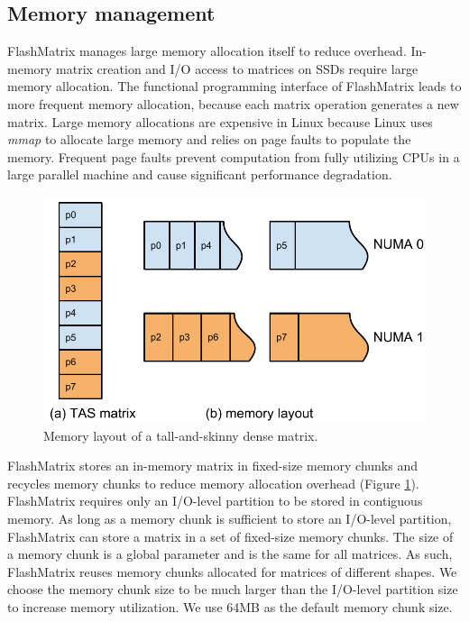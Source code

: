 \subsection{Memory management} \label{sec:mem}
FlashMatrix manages large memory allocation itself to reduce overhead.
In-memory matrix creation and I/O access to matrices on SSDs require large memory
allocation. The functional programming interface of FlashMatrix leads to more
frequent memory allocation, because each matrix operation generates a new matrix. 
Large memory allocations are expensive in Linux because Linux uses \textit{mmap}
to allocate large memory and relies on page faults to populate the memory.
Frequent page faults prevent computation from fully utilizing CPUs in a large
parallel machine and cause significant performance degradation.

\begin{figure}
	\centering
	\includegraphics[scale=0.5]{./matrix_mem.pdf}
	\caption{Memory layout of a tall-and-skinny dense matrix.}
	\label{fig:mat_mem}
\end{figure}

FlashMatrix stores an in-memory matrix in fixed-size memory chunks and
recycles memory chunks to reduce memory allocation overhead (Figure
\ref{fig:mat_mem}). FlashMatrix requires only an I/O-level partition to
be stored in contiguous memory. As long as a memory chunk is sufficient
to store an I/O-level partition, FlashMatrix can store a matrix in a set
of fixed-size memory chunks. The size of a memory chunk is a global parameter
and is the same for all matrices. As such, FlashMatrix reuses memory chunks
allocated for matrices of different shapes. 
We choose the memory chunk
size to be much larger than the I/O-level partition size to increase
memory utilization. We use 64MB as the default memory chunk size.

